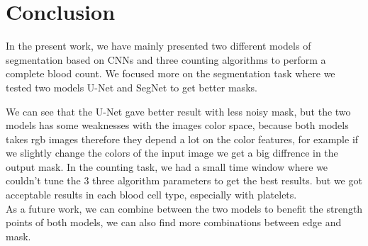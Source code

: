 \documentclass[conference]{IEEEtran}
\begin{document}
\section{Conclusion}

In the present work, we have mainly presented two different models of segmentation based on CNNs and three counting algorithms to perform a complete blood count.
We focused more on the segmentation task where  we tested two models U-Net and SegNet to get better masks. 

We can see that the U-Net gave better result with less noisy mask, but the two models has some weaknesses with the images color space, because both models takes rgb images therefore they depend a lot on the color features, for example if we slightly change the colors of the input image we get a big diffrence in the output mask.
In the counting task, we had a small time window where we couldn't tune the 3 three algorithm parameters to get the best results. but we got acceptable results in each blood cell type, especially with platelets.\\

As a future work, we can combine between the two models to benefit the strength points of both models, we can also find more combinations between edge and mask.



\end{document}
